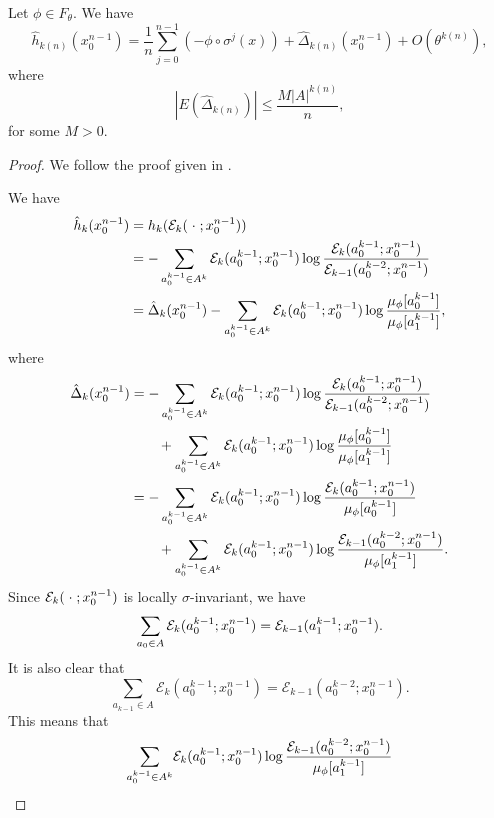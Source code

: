\begin{lemma}\label{lem:cm-4-1}
	Let $\phi \in F_\theta$. We have
	\begin{equation}
		\hat{h}_{k(n)}(x_0^{n - 1}) = \frac{1}{n}\sum_{j = 0}^{n - 1}(-\phi \circ \sigma^j(x)) + \hat{\Delta}_{k(n)}(x_0^{n - 1}) + O(\theta^{k(n)}),
	\end{equation}
	where
	\[
		|E(\hat{\Delta}_{k(n)})| \leq \frac{M|A|^{k(n)}}{n},
	\]
	for some $M > 0$.
	\begin{proof}
		We follow the proof given in \cite[p10-11]{chazottes-maldonado:cbfee}.
		
		We have
		\begin{align}
			\hat{h}_k(x_0^{n - 1}) &= h_k(\mathcal{E}_k(\mathrel{}\cdot\mathrel{}; x_0^{n - 1})) \nonumber \\
				&= -\sum_{a_0^{k - 1} \in A^k}{\mathcal{E}_k(a_0^{k - 1}; x_0^{n - 1}) \log{\frac{\mathcal{E}_k(a_0^{k - 1}; x_0^{n - 1})}{\mathcal{E}_{k - 1}(a_0^{k - 2}; x_0^{n - 1})}}} \nonumber \\
				&= \hat{\Delta}_k(x_0^{n - 1}) -\sum_{a_0^{k - 1} \in A^k}\mathcal{E}_k(a_0^{k - 1}; x_0^{n - 1}) \log{\frac{\mu_\phi[a_0^{k - 1}]}{\mu_\phi[a_1^{k - 1}]}}, \label{fml:cm-11}
		\end{align}
		where
		\begin{align*}
			\hat{\Delta}_k(x_0^{n - 1}) &=-\sum_{a_0^{k - 1} \in A^k}{\mathcal{E}_k(a_0^{k - 1}; x_0^{n - 1}) \log{\frac{\mathcal{E}_k(a_0^{k - 1}; x_0^{n - 1})}{\mathcal{E}_{k - 1}(a_0^{k - 2}; x_0^{n - 1})}}} \\
				& \qquad + \sum_{a_0^{k - 1} \in A^k}\mathcal{E}_k(a_0^{k - 1}; x_0^{n - 1}) \log{\frac{\mu_\phi[a_0^{k - 1}]}{\mu_\phi[a_1^{k - 1}]}} \\
				&=-\sum_{a_0^{k - 1} \in A^k}{\mathcal{E}_k(a_0^{k - 1}; x_0^{n - 1}) \log{\frac{\mathcal{E}_k(a_0^{k - 1}; x_0^{n - 1})}{\mu_\phi[a_0^{k - 1}]}}} \\
				& \qquad + \sum_{a_0^{k - 1} \in A^k}\mathcal{E}_k(a_0^{k - 1}; x_0^{n - 1}) \log{\frac{\mathcal{E}_{k - 1}(a_0^{k - 2}; x_0^{n - 1})}{\mu_\phi[a_1^{k - 1}]}}.
		\end{align*}
		Since $\mathcal{E}_k(\mathrel{}\cdot\mathrel{}; x_0^{n - 1})$ is locally $\sigma$-invariant, we have
		\[
			\sum_{a_0 \in A}{\mathcal{E}_k(a_0^{k - 1}; x_0^{n - 1})} = \mathcal{E}_{k - 1}(a_1^{k - 1}; x_0^{n - 1}).
		\]
		It is also clear that
		\[
			\sum_{a_{k - 1} \in A}{\mathcal{E}_k(a_0^{k - 1}; x_0^{n - 1})} = \mathcal{E}_{k - 1}(a_0^{k - 2}; x_0^{n - 1}).
		\]
		This means that
		\begin{align*}
			\sum_{a_0^{k - 1} \in A^k}&\E_k(a_0^{k - 1}; x_0^{n - 1}) \log{\frac{\E_{k - 1}(a_0^{k - 2}; x_0^{n - 1})}{\mu_\phi[a_1^{k - 1}]}} \\

\end{align*}
\end{proof}
\end{lemma}

